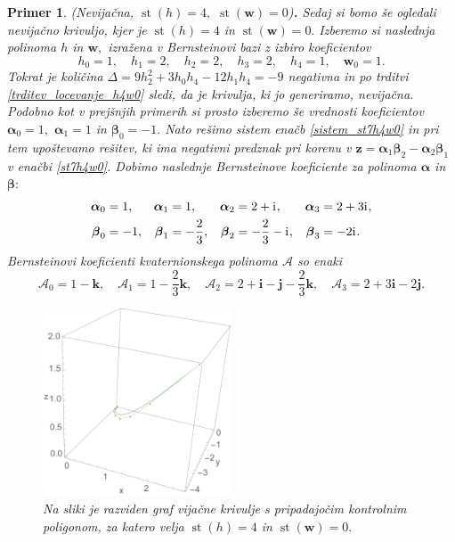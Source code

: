 \documentclass[12pt,a4paper,twoside]{article}
\newcommand{\iu}{\mathrm{i}\mkern1mu} %
\theoremstyle{definition} %
\theoremstyle{plain} %
\theoremstyle{primerstyle}
\newtheorem{primer}[definicija]{Primer}
\numberwithin{equation}{section}  %
\newcommand{\iV}{\mathbf{i}}
\newcommand{\jV}{\mathbf{j}}
\newcommand{\kV}{\mathbf{k}}
\newcommand{\wV}{\mathbf{w}}
\newcommand{\zV}{\mathbf{z}}
\newcommand{\AQ}{\mathcal{A}}
\newcommand{\balpha}{\boldsymbol \alpha}
\newcommand{\bbeta}{\boldsymbol \beta}
\DeclareMathOperator{\st}{st}
\begin{document}
\begin{primer}
	\textnormal{ }(Nevijačna, $\st(h)=4,$ $\st(\wV)=0$)\textbf{.}
	Sedaj si bomo še ogledali nevijačno krivuljo, kjer je $\st(h)=4$ in $\st(\wV)=0.$ Izberemo si naslednja polinoma $h$ in $\wV,$ izražena v Bernsteinovi bazi z izbiro koeficientov
	\begin{equation*}
		h_0=1,\quad h_1=2,\quad h_2=2,\quad h_3=2,\quad h_4=1,\quad \wV_0=1.
	\end{equation*}
	Tokrat je količina $\Delta=9h_2^2+3h_0h_4-12h_1h_4=-9$ negativna in po trditvi \ref{trditev_locevanje_h4w0} sledi, da je krivulja, ki jo generiramo, nevijačna. Podobno kot v prejšnjih primerih si prosto izberemo še vrednosti koeficientov $\balpha_0=1,$ $\balpha_1=1$ in $\bbeta_0=-1.$ Nato rešimo sistem enačb \eqref{sistem_st7h4w0} in pri tem upoštevamo rešitev, ki ima negativni predznak pri korenu v $\zV=\balpha_1\bbeta_2-\balpha_2\bbeta_1$ v enačbi \eqref{st7h4w0}. Dobimo naslednje Bernsteinove koeficiente za polinoma $\balpha$ in $\bbeta:$
	\begin{align*}
		\balpha_0&=1,&\balpha_1&=1,&\balpha_2&=2+\iu,&\balpha_3&=2+3\iu,\\
		\bbeta_0&=-1,&\bbeta_1&=-\frac{2}{3},&\bbeta_2&=-\frac{2}{3}-\iu,&\bbeta_3&=-2\iu.
	\end{align*}
	Bernsteinovi koeficienti kvaternionskega polinoma $\AQ$ so enaki
	\begin{equation*}
		\AQ_0=1-\kV,\quad\AQ_1=1-\frac{2}{3}\kV,\quad\AQ_2=2+\iV-\jV-\frac{2}{3}\kV,\quad\AQ_3=2+3\iV-2\jV.
	\end{equation*}
	\begin{figure}[h]
	  \centering
	  \includegraphics[width=0.5\textwidth]{images/h4w0_nevijacna.pdf}
	  \caption[Primer nevijačne krviulje.]{Na sliki je razviden graf vijačne krivulje s pripadajočim kontrolnim poligonom, za katero velja $\st(h)=4$ in $\st(\wV)=0.$}
	  \label{fig:h4w0_nevijacna}
	\end{figure}
	

\end{primer}
\end{document}
